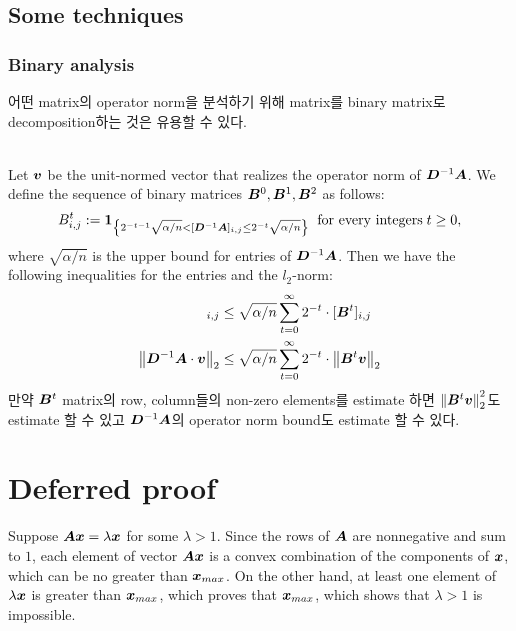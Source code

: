 \documentclass[10pt]{article}
\begin{document}
\subsection{Some techniques}
\subsubsection{Binary analysis}
어떤 matrix의 operator norm을 분석하기 위해 matrix를 binary matrix로 decomposition하는 것은 유용할 수 있다.  \\~\\ 

\begin{ginzabox}[Example]
Let ${\bm{v}}$ be the unit-normed vector that realizes the operator norm of ${\bm{D}}^{-1} {\bm{A}}$. We define the sequence of binary matrices ${\bm{B}}^0, {\bm{B}}^1, {\bm{B}}^2$ as follows:
\begin{equation}
    B_{i,j}^t := \mathbf{1}_{\left\{ 2^{-t-1}\sqrt{\alpha /n} < [{\bm{D}}^{-1} {\bm{A}}]_{i,j} \leq 2^{-t} \sqrt{\alpha/ n} \right\}} \; \text{\;for every integers\;} t \geq 0,  
\end{equation}
where $\sqrt{\alpha/n}$ is the upper bound for entries of ${\bm{D}}^{-1} {\bm{A}}$.  Then we have the following inequalities for the entries and the $l_2$-norm: 
\begin{align}
    [\mD^{-1} \mA]_{i, j} &\leq \sqrt{\alpha /n } \sum_{t=0}^{\infty} 2^{-t} \cdot [\mB^t]_{i, j} \\ 
    \norm{\mD^{-1} \mA \cdot \vv}_2 &\leq \sqrt{\alpha /n} \sum_{t=0}^{\infty} 2^{-t} \cdot \norm{\mB^t \vv}_2 
\end{align}
만약 ${\bm{B}}^t$ matrix의 row, column들의 non-zero elements를 estimate 하면 $\left\lVert{\bm{B}}^t {\bm{v}}\right\rVert_2^2$도 estimate 할 수 있고 ${\bm{D}}^{-1} {\bm{A}}$의 operator norm bound도 estimate 할 수 있다.
\end{ginzabox}
\section*{Deferred proof}
Suppose ${\bm{A}} {\bm{x}} = \lambda {\bm{x}}$ for some $\lambda >1$. Since the rows of ${\bm{A}}$ are nonnegative and sum to $1$, each element of vector ${\bm{A}} {\bm{x}}$ is a convex combination of the components of ${\bm{x}}$, which can be no greater than ${\bm{x}}_{max}$. On the other hand, at least one element of $\lambda {\bm{x}}$ is greater than ${\bm{x}}_{max}$, which proves that ${\bm{x}}_{max}$, which shows that $\lambda >1$ is impossible. 


\end{document}
